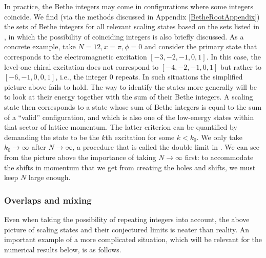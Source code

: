 \documentclass[a4paper,10pt]{article}
\newcommand{\hubert}[1]{$\framebox{\tiny h}$\ \textbf{\texttt{{\color{blue}\footnotesize#1}}}}
\newcommand{\linnea}[1]{$\framebox{\tiny L}$\ \textbf{\texttt{{\color{red}\footnotesize#1}}}}
\begin{document}
In practice, the Bethe integers may come in configurations where some integers coincide. 
%
We find (via the methods discussed in Appendix \ref{BetheRootAppendix}) the sets of Bethe integers for all relevant scaling states based on the sets listed in \cite{Olga}, in which the possibility of coinciding integers is also briefly discussed. 
%
As a concrete example, take $N=12,x=\pi,\phi=0$ and consider the primary state  that corresponds to the electromagnetic excitation $[-3,-2,-1,0,1]$. In this case, the level-one chiral excitation does not correspond to $[-4,-2,-1,0,1]$ but rather to
$[-6,-1,0,0,1]$, i.e., the integer $0$ repeats. In such situations the simplified picture above fails to hold. The way to identify the states more generally will be to look at their energy together with the sum of their Bethe integers. A scaling state then corresponds to a state whose sum of Bethe integers is equal to the sum of a ``valid'' configuration, and which is also one of the low-energy states within that sector of lattice momentum. The latter criterion can be quantified by demanding the state to be the $k$th excitation for some $k<k_0$. We only take $k_0\rightarrow\infty$ after $N\rightarrow\infty$, a procedure that is called the double limit in \cite{KooSaleur}. We can see from the picture above the importance of taking $N\rightarrow\infty$ first: to accommodate the shifts in momentum that we get from creating the holes and shifts, we must keep $N$ large enough.



\subsubsection{Overlaps and mixing}\label{mixing_section}



Even when taking the possibility of repeating integers into account, the above picture of scaling states and their conjectured limits is neater than reality. An important example of a more complicated situation, which will be relevant for the numerical results below, is as follows.
\end{document}
